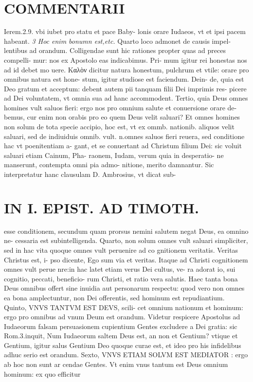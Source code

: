 \documentclass{article}
\begin{document}
\begin{pages}
\section*{COMMENTARII }
\marginpar{[ p.48 ]}\pstart Ierem.2.9. vbi iubet pro statu et pace Baby- lonis orare Iudaeos, vt et ipsi pacem habeant.  \pend
\textit{3 Hoc enim bonumn est,etc. }\pstart Quarto loco admonet de causis impel- lentibus ad orandum. Colligendae sunt hic rationes propter quas ad preces compelli- mur: nos ex Apostolo eas indicabimus. Pri- mum igitur rei honestas nos ad id debet mo uere. Καλὸν dicitur natura honestum, pulchrum et vtile: orare pro omnibus natura est hone- stum, igitur studiose est faciendum. Dein- de, quia est Deo gratum et acceptum: debent autem pii tanquam filii Dei imprimis res- picere ad Dei voluntatem, vt omnia sua ad hanc accommodent. Tertio, quia Deus omnes homines vult saluos fieri: ergo nos pro omnium salute et conuersione orare de- bemus, cur enim non orabis pro eo quem Deus velit saluari? Et omnes homines non solum de tota specie accipio, hoc est, vt ex ommb. nationib. aliquos velit saluari, sed de indiuiduis omnib. vult. n.omnes saluos fieri reuera, sed conditione hac vt poenitentiam a- gant, et se conuertant ad Christum filium Dei: sic voluit saluari etiam Cainum, Pha- raonem, Iudam, verum quia in desperatio- ne manserunt, contempta omni pia admo- nitione, merito damnantur. Sic interpretatur hanc clausulam D. Ambrosius, vt dicat sub-  \pend
\section*{IN I. EPIST. AD TIMOTH. }
\marginpar{[ p.49 ]}\pstart esse conditionem, secundum quam prorsus nemini salutem negat Deus, ea omnino ne- cessaria est subintelligenda. Quarto, non solum omnes vult saluari simpliciter, sed in hac vita quoque omnes vult peruenire ad co gnitionem veritatis. Veritas Christus est, i- pso dicente, Ego sum via et veritas. Itaque ad Christi cognitionem omnes vult perue nre:in hac latet etiam verus Dei cultus, ve- ra adorat io, sui cognitio, peccati, beneficio- rum Christi, et ratio vera salutis. Haec tanta bona Deus omnibus offert sine inuidia aut personarum respectu: quod vero non omnes ea bona amplectuntur, non Dei offerentis, sed hominum est repudiantium.  \pend\pstart Quinto, VNVS TANTVM EST DEVS, scili- cet omnium nationum et hominum: ergo pro omnibus ad vnum Deum est orandum. Videtur respicere Apostolus ad Iudaeorum falsam persuasionem cupientium Gentes excludere a Dei gratia: sic Rom.3.inquit, Num Iudaeorum saltem Deus est, an non et Gentium? vtique et Gentium, igitur salus Gentium Deo quoque curae est, et ideo pro his infidelibus adhuc serio est orandum. Sexto, VNVS ETIAM SOLVM EST MEDIATOR : ergo ab hoc non sunt ar cendae Gentes. Vt enim vnus tantum est Deus omnium hominum: ex quo efficitur  \pend

\end{pages}
\end{document}
